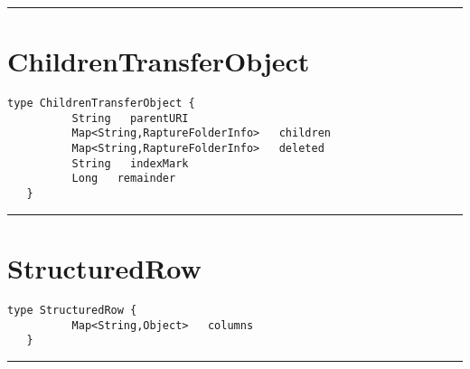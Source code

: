 \rule{12cm}{2pt}
\section{ChildrenTransferObject}
\label{type:ChildrenTransferObject}

\begin{lstlisting}[style=nonumbers]
   type ChildrenTransferObject {
          String   parentURI
          Map<String,RaptureFolderInfo>   children
          Map<String,RaptureFolderInfo>   deleted
          String   indexMark
          Long   remainder
   }
\end{lstlisting}

\rule{12cm}{2pt}
\section{StructuredRow}
\label{type:StructuredRow}

\begin{lstlisting}[style=nonumbers]
   type StructuredRow {
          Map<String,Object>   columns
   }
\end{lstlisting}

\rule{12cm}{2pt}
